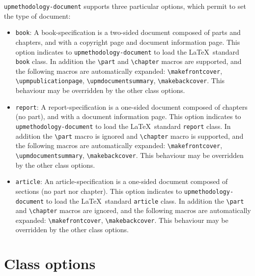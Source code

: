 \documentclass[book,taskpackage,specpackage,codepackage]{upmethodology-document}
\begin{document}
\texttt{upmethodology-document} supports three particular options, which permit to set the type of document:
\begin{itemize}
\item \texttt{book}: A book-specification is a two-sided document composed of parts and chapters, and with a copyright page and document information page. This option indicates to \texttt{upmethodology-document} to load the \LaTeX\ standard \texttt{book} class. In addition the \texttt{{\textbackslash}part} and \texttt{{\textbackslash}chapter} macros are supported, and the following macros are automatically expanded: \texttt{{\textbackslash}makefrontcover}, \texttt{{\textbackslash}upmpublicationpage}, \texttt{{\textbackslash}upmdocumentsummary}, \texttt{{\textbackslash}makebackcover}. This behaviour may be overridden by the other class options.

\item \texttt{report}: A report-specification is a one-sided document composed of chapters (no part), and with a document information page. This option indicates to \texttt{upmethodology-document} to load the \LaTeX\ standard \texttt{report} class. In addition the \texttt{{\textbackslash}part} macro is ignored and \texttt{{\textbackslash}chapter} macro is supported, and the following macros are automatically expanded: \texttt{{\textbackslash}makefrontcover}, \texttt{{\textbackslash}upmdocumentsummary}, \texttt{{\textbackslash}makebackcover}. This behaviour may be overridden by the other class options.

\item \texttt{article}: An article-specification is a one-sided document composed of sections (no part nor chapter). This option indicates to \texttt{upmethodology-document} to load the \LaTeX\ standard \texttt{article} class. In addition the \texttt{{\textbackslash}part} and \texttt{{\textbackslash}chapter} macros are ignored, and the following macros are automatically expanded: \texttt{{\textbackslash}makefrontcover}, \texttt{{\textbackslash}makebackcover}. This behaviour may be overridden by the other class options.

\end{itemize}

\section{Class options}
\end{document}
